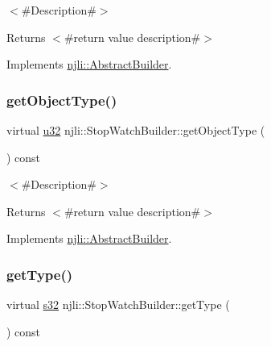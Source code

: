 $<$\#\+Description\#$>$

\begin{DoxyReturn}{Returns}
$<$\#return value description\#$>$ 
\end{DoxyReturn}


Implements \mbox{\hyperlink{classnjli_1_1_abstract_builder_a902f73ea78031b06aca183a417f3413b}{njli\+::\+Abstract\+Builder}}.

\mbox{\label{classnjli_1_1_stop_watch_builder_aabc8d1041bab20e0b6b5618be2713096}} 
\subsubsection{\texorpdfstring{get\+Object\+Type()}{getObjectType()}}
{\footnotesize\ttfamily virtual \mbox{\hyperlink{_util_8h_a10e94b422ef0c20dcdec20d31a1f5049}{u32}} njli\+::\+Stop\+Watch\+Builder\+::get\+Object\+Type (\begin{DoxyParamCaption}{ }\end{DoxyParamCaption}) const\hspace{0.3cm}{\ttfamily [virtual]}}

$<$\#\+Description\#$>$

\begin{DoxyReturn}{Returns}
$<$\#return value description\#$>$ 
\end{DoxyReturn}


Implements \mbox{\hyperlink{classnjli_1_1_abstract_builder_a0f2d344fcf697b167f4f2b1122b5fb33}{njli\+::\+Abstract\+Builder}}.

\mbox{\label{classnjli_1_1_stop_watch_builder_a1be64d37292e7b7a889faf7f4fc4c713}} 
\subsubsection{\texorpdfstring{get\+Type()}{getType()}}
{\footnotesize\ttfamily virtual \mbox{\hyperlink{_util_8h_aa62c75d314a0d1f37f79c4b73b2292e2}{s32}} njli\+::\+Stop\+Watch\+Builder\+::get\+Type (\begin{DoxyParamCaption}{ }\end{DoxyParamCaption}) const\hspace{0.3cm}{\ttfamily [virtual]}}

